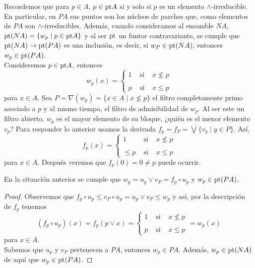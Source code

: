 Recordemos que para $p\in A$, $p\in \mathrm{pt} A$ si y solo si $p$ es un elemento $\wedge$-irreducible. En particular, en $PA$ sus puntos son los núcleos de parches que, como elementos de $PA$ son $\wedge$-irreducibles. Además, cuando consideramos al ensamble $NA$, $\mathrm{pt} (NA)=\{w_p\mid p\in \mathrm{pt} A\}$ y al ser $\mathrm{pt}$ un funtor contravariante, se cumple que $\mathrm{pt}(NA)\to \mathrm{pt}(PA)$ es una inclusión, es decir, si $w_P\in \mathrm{pt}(NA)$, entonces $w_p\in \mathrm{pt}(PA)$.\\

Consideremos $p\in \mathrm{pt} A$, entonces 
\[
w_p(x)= \left\{ \begin{array}{lcc} 1 & \mbox{ si } & x \nleq p \\ \\ p & \mbox{ si } & x \leq p \end{array} \right.
\]
para $x\in A$. Sea $P=\nabla(w_p)=\{x\in A\mid x\nleq p\}$ el filtro completamente primo asociado a $p$ y al mismo tiempo, el filtro de admisibilidad de $w_p$. Al ser este un filtro abierto, $w_p$ es el mayor elemento de su bloque, ¿quién es el menor elemento $v_p$? Para responder lo anterior usamos la derivada $f_p=f_P=\dot{\bigvee}\{v_y\mid y\in P\}$. Así,
\[
f_p(x)= \left\{ \begin{array}{lcc} 1 & \mbox{ si } & x \nleq p \\ \\ \leq p & \mbox{ si } & x \leq p \end{array} \right.
\]
para $x\in A$. Después veremos que $f_p(0)=0\neq p$ puede ocurrir.

\begin{lem}\label{Lema9.3.1}
    En la situación anterior se cumple que $w_p=u_p\vee v_P=f_p\circ u_p$ y $w_p\in \mathrm{pt} (PA)$.
\end{lem}

\begin{proof}
    Observemos que $f_p\circ u_p\leq v_P\circ u_p=u_p\vee v_P\leq w_p$ y así, por la descripción de $f_p$ tenemos
    \[
    (f_p\circ u_p)(x)=f_p(p\vee x)=\left\{ \begin{array}{lcc} 1 & \mbox{ si } & x \nleq p \\ \\ p & \mbox{ si } & x \leq p \end{array} \right.=w_p(x)
    \]
    para $x\in A$.\\

    Sabemos que $u_p$ y $v_P$ pertenecen a $PA$, entonces $w_p\in PA$. Además, $w_p\in \mathrm{pt}(NA)$ de aquí que $w_p\in \mathrm{pt}(PA)$.
\end{proof}


